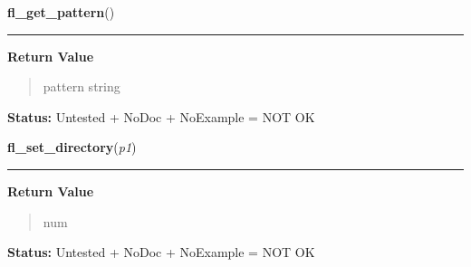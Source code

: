     \vspace{0.5ex}

\hspace{.8\funcindent}\begin{boxedminipage}{\funcwidth}

    \raggedright \textbf{fl\_get\_pattern}()

    \vspace{-1.5ex}

    \rule{\textwidth}{0.5\fboxrule}
\setlength{\parskip}{2ex}
\setlength{\parskip}{1ex}
      \textbf{Return Value}
    \vspace{-1ex}

      \begin{quote}
      pattern string

      \end{quote}

\textbf{Status:} Untested + NoDoc + NoExample = NOT OK



    \end{boxedminipage}

    \label{xformslib:library:fl_set_directory}

    \vspace{0.5ex}

\hspace{.8\funcindent}\begin{boxedminipage}{\funcwidth}

    \raggedright \textbf{fl\_set\_directory}(\textit{p1})

    \vspace{-1.5ex}

    \rule{\textwidth}{0.5\fboxrule}
\setlength{\parskip}{2ex}
\setlength{\parskip}{1ex}
      \textbf{Return Value}
    \vspace{-1ex}

      \begin{quote}
      num

      \end{quote}

\textbf{Status:} Untested + NoDoc + NoExample = NOT OK



    \end{boxedminipage}

    \label{xformslib:library:fl_set_pattern}

